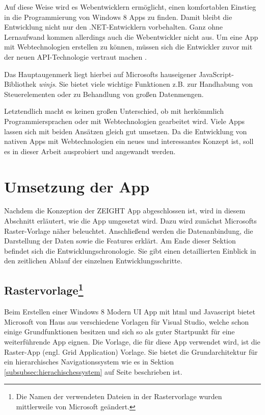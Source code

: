 \documentclass[12pt,a4paper,bibtotoc,abstracton]{scrartcl}
\begin{document}
Auf diese Weise wird es Webentwicklern ermöglicht, einen komfortablen Einstieg in die Programmierung von Windows 8 Apps zu finden. Damit bleibt die Entwicklung nicht nur den .NET-Entwicklern vorbehalten. Ganz ohne Lernaufwand kommen allerdings auch die Webentwickler nicht aus. Um eine App mit Webtechnologien erstellen zu können, müssen sich die Entwickler zuvor mit der neuen API-Technologie vertraut machen \citep{Bleske2012}.

Das Hauptaugenmerk liegt hierbei auf Microsofts hauseigener JavaScript-Bibliothek \textit{\ac{winjs}}. Sie bietet viele wichtige Funktionen z.B. zur Handhabung von Steuerelementen oder zu Behandlung von großen Datenmengen. 

Letztendlich macht es keinen großen Unterschied, ob mit herkömmlich Programmiersprachen oder mit Webtechnologien gearbeitet wird. Viele Apps lassen sich mit beiden Ansätzen gleich gut umsetzen. Da die Entwicklung von nativen Apps mit Webtechnologien ein neues und interessantes Konzept ist, soll es in dieser Arbeit ausprobiert und angewandt werden.

\newpage
\section{Umsetzung der App}
\label{sec:umsetzungderapp}
Nachdem die Konzeption der ZEIGHT App abgeschlossen ist, wird in diesem Abschnitt erläutert, wie die App umgesetzt wird. Dazu wird zunächst Microsofts Raster-Vorlage näher beleuchtet. Anschließend werden die Datenanbindung, die Darstellung der Daten sowie die Features erklärt. Am Ende dieser Sektion befindet sich die Entwicklungschronologie. Sie gibt einen detaillierten Einblick in den zeitlichen Ablauf der einzelnen Entwicklungsschritte.

\subsection[Rastervorlage] {Rastervorlage\footnote{Die Namen der verwendeten Dateien in der Rastervorlage wurden mittlerweile von Microsoft geändert.}}
\label{subsec:rastervorlage}
Beim Erstellen einer Windows 8 Modern UI App mit \ac{html} und Javascript bietet Microsoft von Haus aus verschiedene Vorlagen für Visual Studio, welche schon einige Grundfunktionen besitzen und sich so als guter Startpunkt für eine weiterführende App eignen. Die Vorlage, die für diese App verwendet wird, ist die Raster-App (engl. Grid Application) Vorlage. Sie bietet die Grundarchitektur für ein hierarchisches Navigationssystem wie es in Sektion \ref{subsubsec:hierachischessystem} auf Seite \pageref{subsubsec:hierachischessystem} beschrieben ist.
\end{document}
